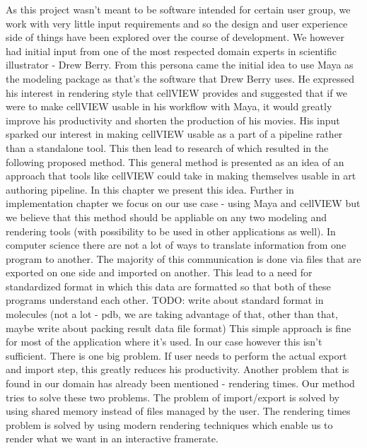 \documentclass[
  digital, %
  table,   %
  lof,     %
  lot,     %
]{fithesis3}
\begin{document}
{As this project wasn't meant to be software intended for certain user group, we work with very little input requirements and so the design and user experience side of things have been explored over the course of development. We however had initial input from one of the most respected domain experts in scientific illustrator - Drew Berry. From this persona came the initial idea to use Maya as the modeling package as that's the software that Drew Berry uses. He expressed his interest in rendering style that cellVIEW provides and suggested that if we were to make cellVIEW usable in his workflow with Maya, it would greatly improve his productivity and shorten the production of his movies. His input sparked our interest in making cellVIEW usable as a part of a pipeline rather than a standalone tool. This then lead to research of which resulted in the following proposed method. This general method is presented as an idea of an approach that tools like cellVIEW could take in making themselves usable in art authoring pipeline. In this chapter we present this idea. Further in implementation chapter we focus on our use case - using Maya and cellVIEW but we believe that this method should be appliable on any two modeling and rendering tools (with possibility to be used in other applications as well).
In computer science there are not a lot of ways to translate information from one program to another. The majority of this communication is done via files that are exported on one side and imported on another. This lead to a need for standardized format in which this data are formatted so that both of these programs understand each other. TODO: write about standard format in molecules (not a lot - pdb, we are taking advantage of that, other than that, maybe write about packing result data file format) This simple approach is fine for most of the application where it's used. In our case however this isn't sufficient. There is one big problem. If user needs to perform the actual export and import step, this greatly reduces his productivity. Another problem that is found in our domain has already been mentioned - rendering times. 
Our method tries to solve these two problems. The problem of import/export is solved by using shared memory instead of files managed by the user. The rendering times problem is solved by using modern rendering techniques which enable us to render what we want in an interactive framerate.
}
\end{document}
